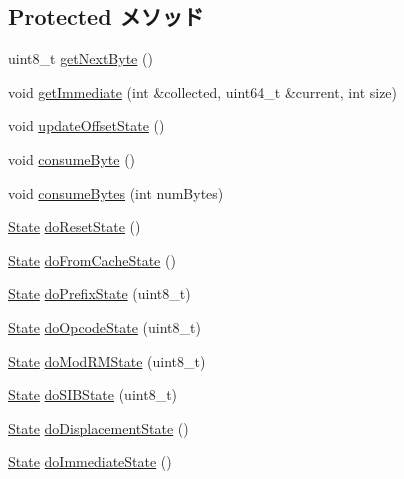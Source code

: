 \subsection*{Protected メソッド}
\begin{DoxyCompactItemize}
\item 
uint8\_\-t \hyperlink{classX86ISA_1_1Decoder_a8f47335339a66b8928a59b6e450ba23e}{getNextByte} ()
\item 
void \hyperlink{classX86ISA_1_1Decoder_aca8cee2ca4f61924adea583f466e5c27}{getImmediate} (int \&collected, uint64\_\-t \&current, int size)
\item 
void \hyperlink{classX86ISA_1_1Decoder_a9b25276214b33147c8d3bf84e1aa778c}{updateOffsetState} ()
\item 
void \hyperlink{classX86ISA_1_1Decoder_ac0b7514336823f27e26271bcad4563a8}{consumeByte} ()
\item 
void \hyperlink{classX86ISA_1_1Decoder_a34f1e4d13220afca8ec5c23596daba7e}{consumeBytes} (int numBytes)
\item 
\hyperlink{classX86ISA_1_1Decoder_a5d74787dedbc4e11c1ab15bf487e61f8}{State} \hyperlink{classX86ISA_1_1Decoder_a3e359a01a10d324b1a5f5931b6aafb41}{doResetState} ()
\item 
\hyperlink{classX86ISA_1_1Decoder_a5d74787dedbc4e11c1ab15bf487e61f8}{State} \hyperlink{classX86ISA_1_1Decoder_a8db8642a115e086e090c7aabf61b8b8d}{doFromCacheState} ()
\item 
\hyperlink{classX86ISA_1_1Decoder_a5d74787dedbc4e11c1ab15bf487e61f8}{State} \hyperlink{classX86ISA_1_1Decoder_a34e20e41a8a8172e08cbf7f09ef390a1}{doPrefixState} (uint8\_\-t)
\item 
\hyperlink{classX86ISA_1_1Decoder_a5d74787dedbc4e11c1ab15bf487e61f8}{State} \hyperlink{classX86ISA_1_1Decoder_af4ad421adb9b081935801bf19bf0d563}{doOpcodeState} (uint8\_\-t)
\item 
\hyperlink{classX86ISA_1_1Decoder_a5d74787dedbc4e11c1ab15bf487e61f8}{State} \hyperlink{classX86ISA_1_1Decoder_af92cd28d02e33555be9f257fa37e988b}{doModRMState} (uint8\_\-t)
\item 
\hyperlink{classX86ISA_1_1Decoder_a5d74787dedbc4e11c1ab15bf487e61f8}{State} \hyperlink{classX86ISA_1_1Decoder_a429d36cbff305b40608c013c0c6a15b1}{doSIBState} (uint8\_\-t)
\item 
\hyperlink{classX86ISA_1_1Decoder_a5d74787dedbc4e11c1ab15bf487e61f8}{State} \hyperlink{classX86ISA_1_1Decoder_a159a4726e8800be2876f6d3100193d4d}{doDisplacementState} ()
\item 
\hyperlink{classX86ISA_1_1Decoder_a5d74787dedbc4e11c1ab15bf487e61f8}{State} \hyperlink{classX86ISA_1_1Decoder_ad402df3f8c4d1f4fb2b7a29d72ba00ec}{doImmediateState} ()
\end{DoxyCompactItemize}

